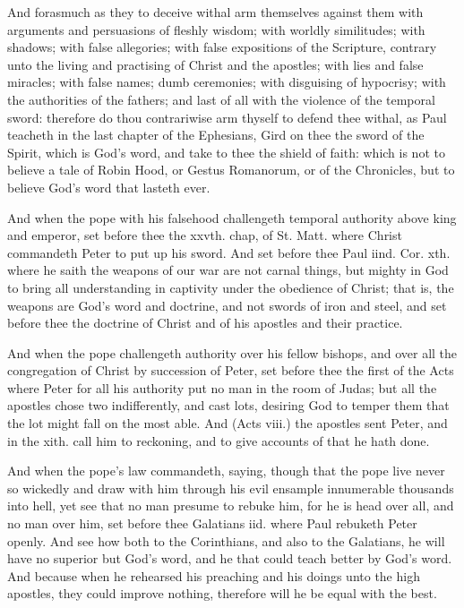 And forasmuch as they to deceive withal arm themselves 
against them with arguments and persuasions of fleshly 
wisdom; with worldly similitudes; with shadows; with false 
allegories; with false expositions of the Scripture, contrary 
unto the living and practising of Christ and the apostles; 
with lies and false miracles; with false names; dumb ceremonies;
with disguising of hypocrisy; with the authorities 
of the fathers; and last of all with the violence of the temporal
sword: therefore do thou contrariwise arm thyself to 
defend thee withal, as Paul teacheth in the last chapter of 
the Ephesians, Gird on thee the sword of the Spirit, which 
is God's word, and take to thee the shield of faith: which is 
not to believe a tale of Robin Hood, or Gestus Romanorum,
or of the Chronicles, but to believe God's word that 
lasteth ever. 

And when the pope with his falsehood challengeth temporal
authority above king and emperor, set before thee 
the xxvth. chap, of St. Matt. where Christ commandeth
Peter to put up his sword. And set before thee 
Paul iind. Cor. xth. where he saith the weapons of our 
war are not carnal things, but mighty in God to bring all 
understanding in captivity under the obedience of Christ; 
that is, the weapons are God's word and doctrine, and not 
swords of iron and steel, and set before thee the doctrine 
of Christ and of his apostles and their practice. 

And when the pope challengeth authority over his fellow 
bishops, and over all the congregation of Christ by succession
of Peter, set before thee the first of the Acts where 
Peter for all his authority put no man in the room of 
Judas; but all the apostles chose two indifferently, and 
cast lots, desiring God to temper them that the lot might 
fall on the most able. And (Acts viii.) the apostles sent 
Peter, and in the xith. call him to reckoning, and to give 
accounts of that he hath done. 

And when the pope's law commandeth, saying, though 
that the pope live never so wickedly and draw with him 
through his evil ensample innumerable thousands into hell, 
yet see that no man presume to rebuke him, for he is head 
over all, and no man over him, set before thee Galatians
iid. where Paul rebuketh Peter openly. And see 
how both to the Corinthians, and also to the Galatians, he 
will have no superior but God's word, and he that could
teach better by God's word. And because when he rehearsed
his preaching and his doings unto the high apostles,
they could improve nothing, therefore will he be equal 
with the best. 

